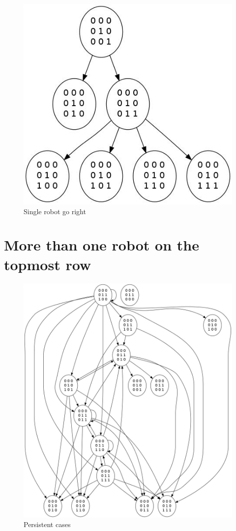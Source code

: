 \documentclass[11pt, a4paper]{article}
\theoremstyle{plain}
\theoremstyle{definition}
\theoremstyle{remark}
\begin{document}
\begin{figure}
\includegraphics[scale=0.50]{graph_single_right.jpg}
\caption{Single robot go right}
\label{graph:right}
\end{figure}

\section{More than one robot on the topmost row}

\begin{figure}
\includegraphics[scale=0.50]{graph_leftmost_mid.jpg}
\caption{Persistent cases}
\label{graph:leftmost_mid}
\end{figure}
\end{document}
